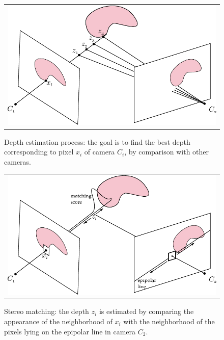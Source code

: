 \begin{figure}[t]
\centering
 \begin{tabular}{c}
  \includegraphics[width=0.92\columnwidth]{./img/ch_soa/depth}\\
 \end{tabular}
 \caption{Depth estimation process: the goal is to find the best depth corresponding to pixel $x_i$ of camera $C_i$, by comparison with other cameras.}
 \label{fig:depth}
\end{figure}


\begin{figure}[t]
\centering
 \begin{tabular}{c}
  \includegraphics[width=0.92\columnwidth]{./img/ch_soa/stereomatching}\\
 \end{tabular}
 \caption{Stereo matching: the depth $z_i$ is estimated by comparing the appearance of the neighborhood of $x_i$ with the neighborhood of the pixels lying on the epipolar line in camera $C_2$.}
 \label{fig:stereomatching}
\end{figure}


